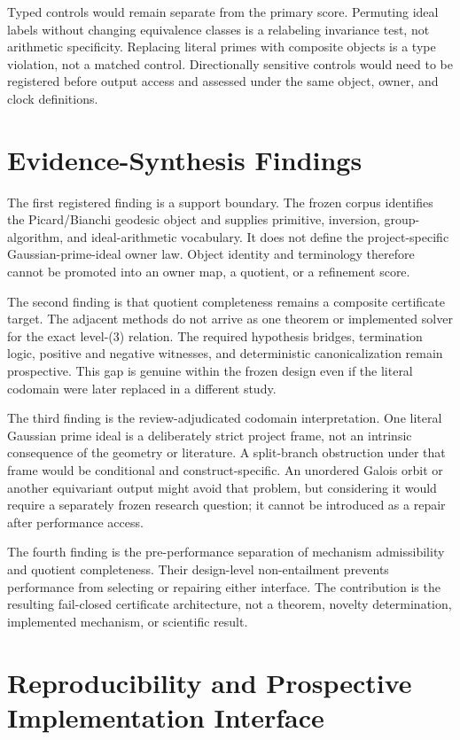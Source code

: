 \documentclass[11pt,a4paper]{article}
\begin{document}
Typed controls would remain separate from the primary score. Permuting ideal labels without changing equivalence classes is a relabeling invariance test, not arithmetic specificity. Replacing literal primes with composite objects is a type violation, not a matched control. Directionally sensitive controls would need to be registered before output access and assessed under the same object, owner, and clock definitions.

\section{Evidence-Synthesis Findings}

The first registered finding is a support boundary. The frozen corpus identifies the Picard/Bianchi geodesic object and supplies primitive, inversion, group-algorithm, and ideal-arithmetic vocabulary. It does not define the project-specific Gaussian-prime-ideal owner law. Object identity and terminology therefore cannot be promoted into an owner map, a quotient, or a refinement score.

The second finding is that quotient completeness remains a composite certificate target. The adjacent methods do not arrive as one theorem or implemented solver for the exact level-(3) relation. The required hypothesis bridges, termination logic, positive and negative witnesses, and deterministic canonicalization remain prospective. This gap is genuine within the frozen design even if the literal codomain were later replaced in a different study.

The third finding is the review-adjudicated codomain interpretation. One literal Gaussian prime ideal is a deliberately strict project frame, not an intrinsic consequence of the geometry or literature. A split-branch obstruction under that frame would be conditional and construct-specific. An unordered Galois orbit or another equivariant output might avoid that problem, but considering it would require a separately frozen research question; it cannot be introduced as a repair after performance access.

The fourth finding is the pre-performance separation of mechanism admissibility and quotient completeness. Their design-level non-entailment prevents performance from selecting or repairing either interface. The contribution is the resulting fail-closed certificate architecture, not a theorem, novelty determination, implemented mechanism, or scientific result.

\section{Reproducibility and Prospective Implementation Interface}
\end{document}
